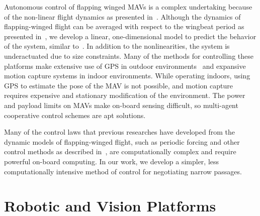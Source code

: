 \documentclass{aamas2013}
\begin{document}
Autonomous control of flapping winged MAVs is a complex undertaking because of
the non-linear flight dynamics as presented
in~\cite{humbert:dipteran2}\cite{cheng:tandrdamping}. Although the dynamics of
flapping-winged flight can be averaged with respect to the wingbeat period as
presented in~\cite{Schenato:flightcontrol}\cite{cheng:tandrdamping}, we develop a
linear, one-dimensional model to predict the behavior of the system, similar
to~\cite{Shigeoka:ornithopter}. In addition to the nonlinearities, the system
is underactuated due to size constraints. Many of the methods for controlling
these platforms make extensive use of GPS in outdoor
environments~\cite{kingston:timeattitude, kanade:3dvision} and expansive
motion capture systems in indoor environments. While operating indoors, using
GPS to estimate the pose of the MAV is not possible, and motion capture
requires expensive and stationary modification of the environment. The power
and payload limits on MAVs make on-board sensing difficult, so multi-agent
cooperative control schemes are apt solutions.

Many of the control laws that previous researches have developed from the
dynamic models of flapping-winged flight, such as periodic forcing and other
control methods as described %
in~\cite{doman:dynamics}\cite{khan:longitudinal_control}\cite{leonard:averaging}, are computationally complex and
require powerful on-board computing. In our work, we develop a simpler, less
computationally intensive method of control for negotiating narrow passages.

\section{Robotic and Vision Platforms}

\end{document}
